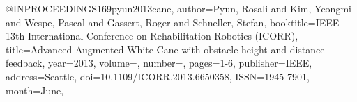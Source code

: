 @INPROCEEDINGS{169pyun2013cane,
author={Pyun, Rosali and Kim, Yeongmi and Wespe, Pascal and Gassert, Roger and Schneller, Stefan},
booktitle={IEEE 13th International Conference on Rehabilitation Robotics (ICORR)}, 
title={Advanced Augmented White Cane with obstacle height and distance feedback}, 
year={2013},
volume={},
number={},
pages={1-6},
publisher={IEEE},
address={Seattle},
doi={10.1109/ICORR.2013.6650358},
ISSN={1945-7901},
month={June},}